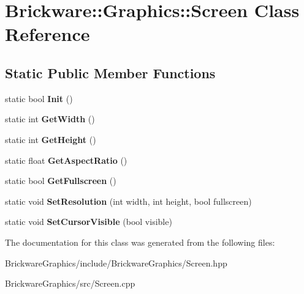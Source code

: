\hypertarget{classBrickware_1_1Graphics_1_1Screen}{}\section{Brickware\+:\+:Graphics\+:\+:Screen Class Reference}
\label{classBrickware_1_1Graphics_1_1Screen}
\subsection*{Static Public Member Functions}
\begin{DoxyCompactItemize}
\item 
\hypertarget{classBrickware_1_1Graphics_1_1Screen_a08488a1d4b0b73af77d1f7e0654c515a}{}static bool {\bfseries Init} ()\label{classBrickware_1_1Graphics_1_1Screen_a08488a1d4b0b73af77d1f7e0654c515a}

\item 
\hypertarget{classBrickware_1_1Graphics_1_1Screen_a61a2b56d290cabafab52f1598d2e8af4}{}static int {\bfseries Get\+Width} ()\label{classBrickware_1_1Graphics_1_1Screen_a61a2b56d290cabafab52f1598d2e8af4}

\item 
\hypertarget{classBrickware_1_1Graphics_1_1Screen_a159e9389714f0f101013bbad4f5044af}{}static int {\bfseries Get\+Height} ()\label{classBrickware_1_1Graphics_1_1Screen_a159e9389714f0f101013bbad4f5044af}

\item 
\hypertarget{classBrickware_1_1Graphics_1_1Screen_a9693583dc11968687fa3eb7ee1a23d43}{}static float {\bfseries Get\+Aspect\+Ratio} ()\label{classBrickware_1_1Graphics_1_1Screen_a9693583dc11968687fa3eb7ee1a23d43}

\item 
\hypertarget{classBrickware_1_1Graphics_1_1Screen_a57ebca05881806e4ae5dfc21db945dab}{}static bool {\bfseries Get\+Fullscreen} ()\label{classBrickware_1_1Graphics_1_1Screen_a57ebca05881806e4ae5dfc21db945dab}

\item 
\hypertarget{classBrickware_1_1Graphics_1_1Screen_aaeeb513c7e4984f5c14b7c1fa0b7c519}{}static void {\bfseries Set\+Resolution} (int width, int height, bool fullscreen)\label{classBrickware_1_1Graphics_1_1Screen_aaeeb513c7e4984f5c14b7c1fa0b7c519}

\item 
\hypertarget{classBrickware_1_1Graphics_1_1Screen_a995464a19048f16cc259fdfb1b7915d9}{}static void {\bfseries Set\+Cursor\+Visible} (bool visible)\label{classBrickware_1_1Graphics_1_1Screen_a995464a19048f16cc259fdfb1b7915d9}

\end{DoxyCompactItemize}


The documentation for this class was generated from the following files\+:\begin{DoxyCompactItemize}
\item 
Brickware\+Graphics/include/\+Brickware\+Graphics/Screen.\+hpp\item 
Brickware\+Graphics/src/Screen.\+cpp\end{DoxyCompactItemize}
